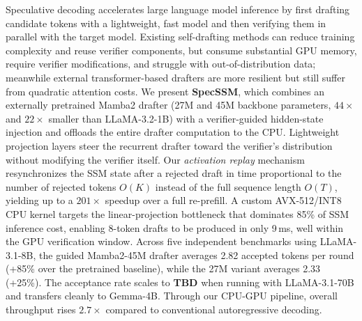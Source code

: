 Speculative decoding accelerates large language model inference by first drafting candidate tokens with a lightweight, fast model and then verifying them in parallel with the target model.
Existing self-drafting methods can reduce training complexity and reuse verifier components, but consume substantial GPU memory, require verifier modifications, and struggle with out-of-distribution data; meanwhile external transformer-based drafters are more resilient but still suffer from quadratic attention costs.
We present \textbf{SpecSSM}, which combines an externally pretrained Mamba2 drafter (27M and 45M backbone parameters, $44\times$ and $22\times$ smaller than LLaMA-3.2-1B) with a verifier-guided hidden-state injection and offloads the entire drafter computation to the CPU.
Lightweight projection layers steer the recurrent drafter toward the verifier's distribution without modifying the verifier itself.
Our \emph{activation replay} mechanism resynchronizes the SSM state after a rejected draft in time proportional to the number of rejected tokens $O(K)$ instead of the full sequence length $O(T)$, yielding up to a $201\times$ speedup over a full re-prefill.
A custom AVX-512/INT8 CPU kernel targets the linear-projection bottleneck that dominates 85\% of SSM inference cost, enabling 8-token drafts to be produced in only 9\,ms, well within the GPU verification window.
Across five independent benchmarks using LLaMA-3.1-8B, the guided Mamba2-45M drafter averages 2.82 accepted tokens per round (+85\% over the pretrained baseline), while the 27M variant averages 2.33 (+25\%).
The acceptance rate scales to \textbf{TBD} when running with LLaMA-3.1-70B and transfers cleanly to Gemma-4B.
Through our CPU-GPU pipeline, overall throughput rises $2.7\times$ compared to conventional autoregressive decoding.